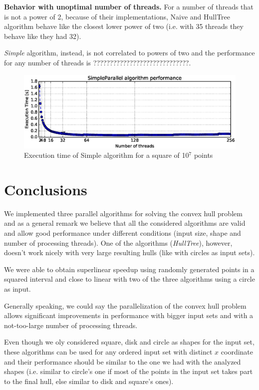 \documentclass[letterpaper]{article}
\newcommand{\mypar}[1]{{\bf #1.}}
\theoremstyle{definition}
\begin{document}
\mypar{Behavior with unoptimal number of threads}
For a number of threads that is not a power of 2, because of their implementations, Naive and HullTree algorithm behave like the closest lower power of two (i.e. with 35 threads they behave like they had 32).

\textit{Simple} algorithm, instead, is not correlated to powers of two and the performance for any number of threads is ?????????????????????????????.

\begin{figure}[!ht]\centering
  \includegraphics[scale=0.33]{./plots/total.eps}
  \caption{Execution time of Simple algorithm for a square of 10$^7$ points\label{SimpleParallel Total}}
\end{figure}



\section{Conclusions}

We implemented three parallel algorithms for solving the convex hull problem and as a general remark we believe that all the considered algorithms are valid and allow good performance under different conditions (input size, shape and number of processing threads).
One of the algorithms (\textit{HullTree}), however, doesn't work nicely with very large resulting hulls (like with circles as input sets).

We were able to obtain superlinear speedup using randomly generated points in a squared interval %
and close to linear with two of the three algorithms using a circle as input.

Generally speaking, we could say the parallelization of the convex hull problem allows significant improvements in performance with bigger input sets and with a not-too-large number of processing threads.

Even though we oly considered square, disk and circle as shapes for the input set, these algorithms can be used for any ordered input set with distinct $x$ coordinate and their performance should be similar to the one we had with the analyzed shapes (i.e. similar to circle's one if most of the points in the input set takes part to the final hull, else similar to disk and square's ones).
\end{document}
